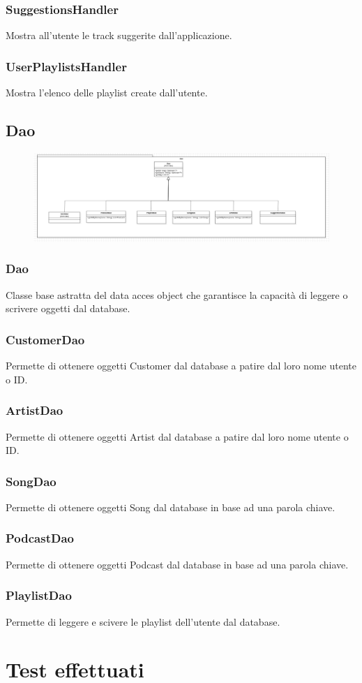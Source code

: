 \documentclass{article}
\begin{document}
\subsubsection{SuggestionsHandler}
Mostra all'utente le track suggerite dall'applicazione.
\subsubsection{UserPlaylistsHandler}
Mostra l'elenco delle playlist create dall'utente.

\subsection{Dao}

\begin{figure}[H]
\includegraphics[scale=0.3]{dao01}
\end{figure}

\subsubsection{Dao}
Classe base astratta del data acces object che garantisce la capacità di leggere
o scrivere oggetti dal database.
\subsubsection{CustomerDao}
Permette di ottenere oggetti Customer dal database a patire dal loro nome utente o ID.
\subsubsection{ArtistDao}
Permette di ottenere oggetti Artist dal database a patire dal loro nome utente o ID.
\subsubsection{SongDao}
Permette di ottenere oggetti Song dal database in base ad una parola chiave.
\subsubsection{PodcastDao}
Permette di ottenere oggetti Podcast  dal database in base ad una parola chiave.
\subsubsection{PlaylistDao}
Permette di leggere e scivere le playlist dell'utente dal database.
\section{Test effettuati}   
\end{document}
